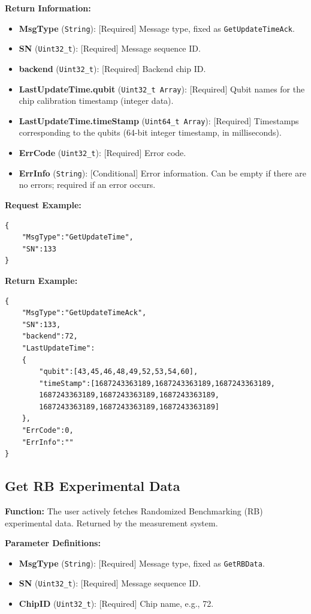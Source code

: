 \documentclass[12pt, a4paper]{article}
\begin{document}
\textbf{Return Information:}
\begin{itemize}
    \item \textbf{MsgType} (\texttt{String}): [Required] Message type, fixed as \texttt{GetUpdateTimeAck}.
    \item \textbf{SN} (\texttt{Uint32\_t}): [Required] Message sequence ID.
    \item \textbf{backend} (\texttt{Uint32\_t}): [Required] Backend chip ID.
    \item \textbf{LastUpdateTime.qubit} (\texttt{Uint32\_t Array}): [Required] Qubit names for the chip calibration timestamp (integer data).
    \item \textbf{LastUpdateTime.timeStamp} (\texttt{Uint64\_t Array}): [Required] Timestamps corresponding to the qubits (64-bit integer timestamp, in milliseconds).
    \item \textbf{ErrCode} (\texttt{Uint32\_t}): [Required] Error code.
    \item \textbf{ErrInfo} (\texttt{String}): [Conditional] Error information. Can be empty if there are no errors; required if an error occurs.
\end{itemize}

\noindent \textbf{Request Example:}
\begin{lstlisting}
{
    "MsgType":"GetUpdateTime",
    "SN":133
}
\end{lstlisting}

\noindent \textbf{Return Example:}
\begin{lstlisting}
{
    "MsgType":"GetUpdateTimeAck",
    "SN":133,
    "backend":72,
    "LastUpdateTime":
    {
        "qubit":[43,45,46,48,49,52,53,54,60],
        "timeStamp":[1687243363189,1687243363189,1687243363189,
        1687243363189,1687243363189,1687243363189,
        1687243363189,1687243363189,1687243363189]
    },
    "ErrCode":0,
    "ErrInfo":""
}
\end{lstlisting}

\subsection{Get RB Experimental Data}

\textbf{Function:} The user actively fetches Randomized Benchmarking (RB) experimental data. Returned by the measurement system.

\textbf{Parameter Definitions:}
\begin{itemize}
    \item \textbf{MsgType} (\texttt{String}): [Required] Message type, fixed as \texttt{GetRBData}.
    \item \textbf{SN} (\texttt{Uint32\_t}): [Required] Message sequence ID.
    \item \textbf{ChipID} (\texttt{Uint32\_t}): [Required] Chip name, e.g., 72.
\end{itemize}
\end{document}
